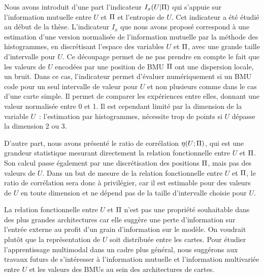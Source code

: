 \documentclass[../main]{subfiles}
\begin{document}
Nous avons introduit d'une part l'indicateur $I_x(U|\Pi)$ qui s'appuie sur l'information mutuelle entre $U$ et $\Pi$ et l'entropie de $U$. Cet indicateur a été étudié au début de la thèse.
L'indicateur $I_x$ que nous avons proposé correspond à une estimation d'une version normalisée de l'information mutuelle par la méthode des histogrammes, en discrétisant l'espace des variables $U$ et $\Pi$, avec une grande taille d'intervalle pour $U$. 
Ce découpage permet de ne pas prendre en compte le fait que les valeurs de $U$ encodées par une position de BMU $\Pi$ ont une dispersion locale, un bruit. Dans ce cas, l'indicateur permet d'évaluer numériquement si un BMU code pour un seul intervalle de valeur pour $U$ et non plusieurs comme dans le cas d'une carte simple. Il permet de comparer les expériences entre elles, donnant une valeur normalisée entre 0 et 1.
Il est cependant limité par la dimension de la variable $U$~: l'estimation par histogrammes, nécessite trop de points si $U$ dépasse la dimension 2 ou 3.

D'autre part, nous avons présenté le ratio de corrélation $\eta(U;\Pi)$, qui est une grandeur statistique mesurant directement la relation fonctionnelle entre $U$ et $\Pi$. Son calcul passe également par une discrétisation des positions $\Pi$, mais pas des valeurs de $U$. 
Dans un but de mesure de la relation fonctionnelle entre $U$ et $\Pi$, le ratio de corrélation sera donc à privilégier, car il est estimable pour des valeurs de $U$ en toute dimension et ne dépend pas de la taille d'intervalle choisie pour $U$.

La relation fonctionnelle entre $U$ et $\Pi$ n'est pas une propriété souhaitable dans des plus grandes architectures car elle suggère une perte d'information sur l'entrée externe au profit d'un grain d'information sur le modèle. On voudrait plutôt que la représentation de $U$ soit distribuée entre les cartes.
Pour étudier l'apprentissage multimodal dans un cadre plus général, nous suggérons aux travaux futurs de s'intéresser à l'information mutuelle et l'information multivariée entre $U$ et les valeurs des BMUs au sein des architectures de cartes.


\ifSubfilesClassLoaded{
    \printbibliography
}{}
\end{document}
